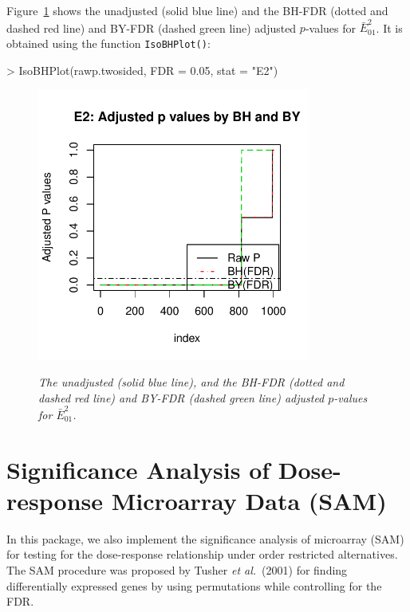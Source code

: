 \documentclass[10pt]{article}
\begin{document}
Figure~\ref{IsoBHPlot} shows the unadjusted (solid blue line) and
the BH-FDR (dotted and dashed red line) and BY-FDR (dashed green
line) adjusted $p$-values for $\bar{E}^2_{01}$. It is obtained using
the function \texttt{IsoBHPlot()}:

\begin{Schunk}
\begin{Sinput}
> IsoBHPlot(rawp.twosided, FDR = 0.05, stat = "E2")
\end{Sinput}
\end{Schunk}


 
\begin{figure}[!h]
\centering
{\includegraphics[width=0.8\textwidth]{IsoGene-IsoBHPlot.pdf}}
\caption{\em {The unadjusted (solid blue line), and the BH-FDR
(dotted and dashed red line) and BY-FDR (dashed green line) adjusted
$p$-values for $\bar{E}_{01}^2$.}} \label{IsoBHPlot}
\end{figure}



\section{Significance Analysis of Dose-response Microarray Data (SAM)}

In this package, we also implement the significance analysis of microarray (SAM) for testing
for the dose-response relationship under order restricted alternatives. The SAM procedure was proposed
by Tusher \textit{et al.}\ (2001) for finding differentially expressed genes by using permutations while controlling for
the FDR.
\end{document}
